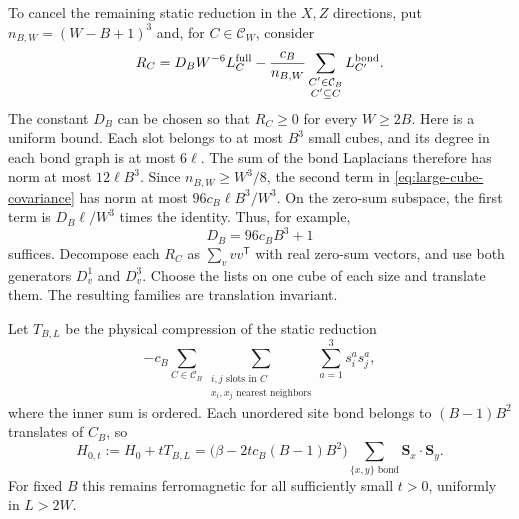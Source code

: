 To cancel the remaining static reduction in the $X,Z$ directions, put
$n_{B,W}=(W-B+1)^3$ and, for $C\in\mathcal C_W$, consider
\begin{equation}
 R_C=D_BW^{-6}L_C^{\rm full}
       -\frac{c_B}{n_{B,W}}
          \sum_{\substack{C'\in\mathcal C_B\\C'\subseteq C}}
                      L_{C'}^{\rm bond}.
 \label{eq:large-cube-covariance}
\end{equation}
The constant $D_B$ can be chosen so that $R_C\ge0$ for every $W\ge2B$.
Here is a uniform bound.  Each slot belongs to at most $B^3$ small cubes,
and its degree in each bond graph is at most $6\ell$.  The sum of the
bond Laplacians therefore has norm at most $12\ell B^3$.  Since
$n_{B,W}\ge W^3/8$, the second term in
\eqref{eq:large-cube-covariance} has norm at most
$96c_B\ell B^3/W^3$.  On the zero-sum subspace, the first term is
$D_B\ell/W^3$ times the identity.  Thus, for example,
\begin{equation}
 D_B=96c_BB^3+1
 \label{eq:DB-choice}
\end{equation}
suffices.  Decompose each $R_C$ as $\sum_v vv^{\mathsf T}$ with real
zero-sum vectors, and use both generators $D_v^1$ and $D_v^3$.  Choose
the lists on one cube of each size and translate them.  The resulting
families are translation invariant.

Let $T_{B,L}$ be the physical compression of the static reduction
\begin{equation}
 -c_B\sum_{C\in\mathcal C_B}
     \sum_{\substack{i,j\text{ slots in }C\\
                     x_i,x_j\text{ nearest neighbors}}}
                   \sum_{a=1}^3s_i^a s_j^a,
 \label{eq:static-reduction}
\end{equation}
where the inner sum is ordered.  Each unordered site bond belongs to
$(B-1)B^2$ translates of $C_B$, so
\[
 H_{0,t}:=H_0+tT_{B,L}
   =\bigl(\beta-2tc_B(B-1)B^2\bigr)
                    \sum_{\{x,y\}\text{ bond}}\mathbf S_x\cdot\mathbf S_y.
\]
For fixed $B$ this remains ferromagnetic for all sufficiently small
$t>0$, uniformly in $L>2W$.


